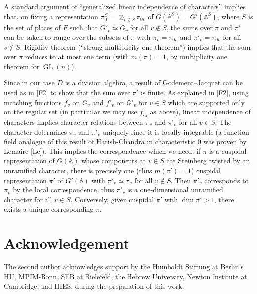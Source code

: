 \documentclass[10pt]{article}
\newcommand{\Adele}{\mathbb A}
\newcommand{\GL}{\operatorname{GL}}
\theoremstyle{deligne}
\begin{document}
A standard argument of ``generalized linear independence of characters'' implies that, on fixing a representation $\pi_0^S=\otimes_{v\notin S}\pi_{0v}$ of $G(\Adele^S)=G'(\Adele^S)$, where $S$ is the set of places of $F$ such that $G'_v\simeq G_v$ for all $v\notin S$, the sums over $\pi$ and $\pi'$ can be taken to range over the subsets of $\pi$ with $\pi_v=\pi_{0v}$ and $\pi'_v=\pi_{0v}$ for all $v\notin S$. Rigidity theorem (``strong multiplicity one theorem'') implies that the sum over $\pi$ reduces to at most one term (with $m(\pi)=1$, by multiplicity one theorem for $\GL(n)$).

Since in our case $D$ is a division algebra, a result of Godement--Jacquet can be used as in [F2] to show that the sum over $\pi'$ is finite. As explained in [F2], using matching functions $f_v$ on $G_v$ and $f'_v$ on $G'_v$ for $v\in S$ which are supported only on the regular set (in particular we may use $f_{v_3}$ as above), linear independence of characters implies character relations between $\pi_v$ and $\pi'_v$ for all $v\in S$. The character determines $\pi_v$ and $\pi'_v$ uniquely since it is locally integrable (a function-field analogue of this result of Harish-Chandra in characteristic $0$ was proven by Lemaire [Le]). This implies the correspondence which we need: if $\pi$ is a cuspidal representation of $G(\Adele)$ whose components at $v\in S$ are Steinberg twisted by an unramified character, there is precisely one (thus $m(\pi')=1$) cuspidal representation $\pi'$ of $G'(\Adele)$ with $\pi'_v\simeq\pi_v$ for all $v\notin S$. Then $\pi'_v$ corresponds to $\pi_v$ by the local correspondence, thus $\pi'_v$ is a one-dimensional unramified character for all $v\in S$. Conversely, given cuspidal $\pi'$ with $\dim\pi'>1$, there exists a unique corresponding $\pi$.

\section*{Acknowledgement}
The second author acknowledges support by the Humboldt Stiftung at Berlin's HU, MPIM-Bonn, SFB at Bielefeld, the Hebrew University, Newton Institute at Cambridge, and IHES, during the preparation of this work.
\end{document}
